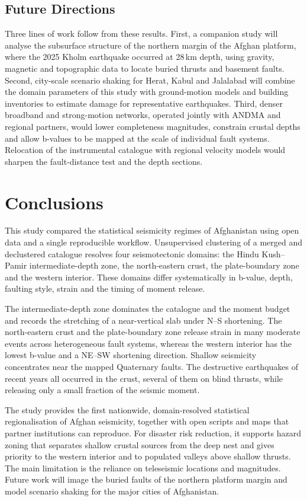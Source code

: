 \documentclass[11pt]{article}
\begin{document}
\subsection{Future Directions}
Three lines of work follow from these results. First, a companion study will
analyse the subsurface structure of the northern margin of the Afghan platform,
where the 2025 Kholm earthquake occurred at 28\,km depth, using gravity, magnetic and
topographic data to locate buried thrusts and basement faults. Second, city-scale
scenario shaking for Herat, Kabul and Jalalabad will combine the domain parameters
of this study with ground-motion models and building inventories to estimate damage
for representative earthquakes. Third, denser broadband and strong-motion networks,
operated jointly with ANDMA and regional partners, would lower completeness
magnitudes, constrain crustal depths and allow b-values to be mapped at the scale of
individual fault systems. Relocation of the instrumental catalogue with regional
velocity models would sharpen the fault-distance test and the depth sections.

\section{Conclusions}\label{sec:conclusions}
This study compared the statistical seismicity regimes of Afghanistan using open
data and a single reproducible workflow. Unsupervised clustering of a merged and
declustered catalogue resolves four seismotectonic domains: the Hindu Kush--Pamir
intermediate-depth zone, the north-eastern crust, the plate-boundary zone and the
western interior. These domains differ systematically in b-value, depth, faulting
style, strain and the timing of moment release.

The intermediate-depth zone dominates the catalogue and the moment budget and
records the stretching of a near-vertical slab under N--S shortening. The
north-eastern crust and the plate-boundary zone release strain in many moderate
events across heterogeneous fault systems, whereas the western interior has the
lowest b-value and a NE--SW shortening direction. Shallow seismicity concentrates
near the mapped Quaternary faults. The destructive earthquakes of recent years all
occurred in the crust, several of them on blind thrusts, while releasing only a small
fraction of the seismic moment.

The study provides the first nationwide, domain-resolved statistical regionalisation
of Afghan seismicity, together with open scripts and maps that partner institutions
can reproduce. For disaster risk reduction, it supports hazard zoning that separates
shallow crustal sources from the deep nest and gives priority to the western
interior and to populated valleys above shallow thrusts. The main limitation is the
reliance on teleseismic locations and magnitudes. Future work will image the buried
faults of the northern platform margin and model scenario shaking for the major
cities of Afghanistan.
\end{document}
